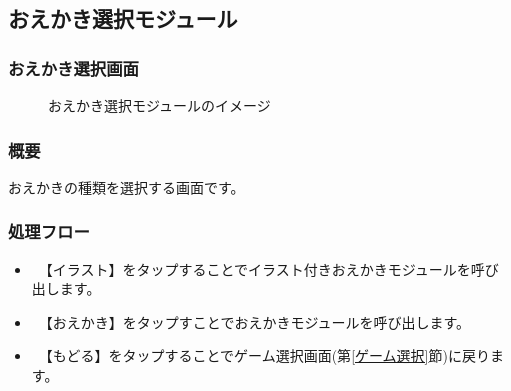\documentclass[a4j]{jarticle}
\begin{document}
\newpage
\subsection{おえかき選択モジュール}
\subsubsection{おえかき選択画面\label{おえかき選択}}
\begin{figure}[H]
    \begin{center}
    \caption {おえかき選択モジュールのイメージ}
    \label{functionselection}
    \end{center}
\end{figure}

\subsubsection*{概要}
 おえかきの種類を選択する画面です。

\subsubsection*{処理フロー}
\begin{itemize}
\item　【イラスト】をタップすることでイラスト付きおえかきモジュールを呼び出します。
\item　【おえかき】をタップすことでおえかきモジュールを呼び出します。
\item　【もどる】をタップすることでゲーム選択画面(第\ref{ゲーム選択}節)に戻ります。
\end{itemize}
\end{document}
